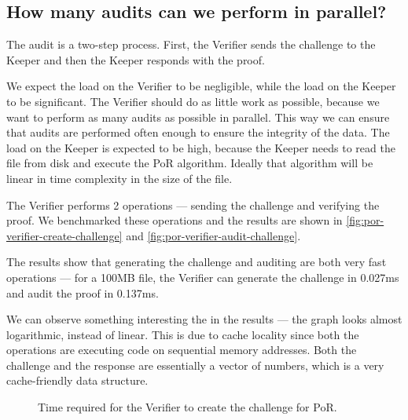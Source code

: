 \subsection{How many audits can we perform in parallel?}

The audit is a two-step process.
First, the Verifier sends the challenge to the Keeper and then the Keeper responds with the proof.

We expect the load on the Verifier to be negligible, while the load on the Keeper to be significant.
The Verifier should do as little work as possible,
because we want to perform as many audits as possible in parallel.
This way we can ensure that audits are performed often enough to ensure the integrity of the data.
The load on the Keeper is expected to be high,
because the Keeper needs to read the file from disk and execute the PoR algorithm.
Ideally that algorithm will be linear in time complexity in the size of the file.

The Verifier performs 2 operations --- sending the challenge and verifying the proof.
We benchmarked these operations and the results are shown in \autoref{fig:por-verifier-create-challenge}
and \autoref{fig:por-verifier-audit-challenge}.

The results show that generating the challenge and auditing are both very fast operations ---
for a 100MB file, the Verifier can generate the challenge in 0.027ms and
audit the proof in 0.137ms.

We can observe something interesting the in the results ---
the graph looks almost logarithmic, instead of linear.
This is due to cache locality since both the operations are executing code on sequential memory addresses.
Both the challenge and the response are essentially a vector of numbers,
which is a very cache-friendly data structure.

\begin{figure}
  \myfloatalign
  \caption{Time required for the Verifier to create the challenge for PoR.}
  \label{fig:por-verifier-create-challenge}
\end{figure}

